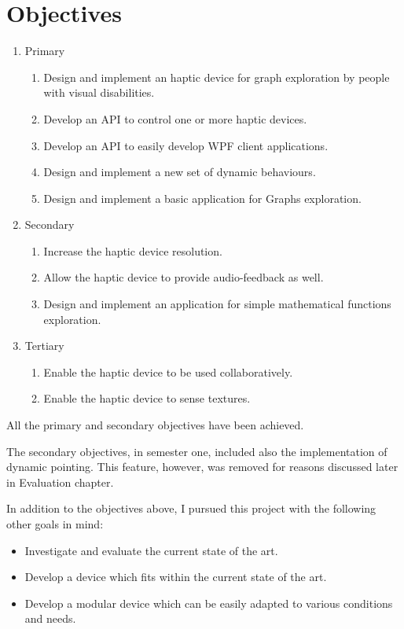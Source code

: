 \chapter{Objectives}


\begin{enumerate}
	\item Primary
    \begin{enumerate}
    	\item Design and implement an haptic device for graph exploration by people with visual disabilities.
        \item Develop an API to control one or more haptic devices.
        \item Develop an API to easily develop WPF client applications.
        \item Design and implement a new set of dynamic behaviours.
        \item Design and implement a basic application for Graphs exploration.
    \end{enumerate}
    \item Secondary
    \begin{enumerate}
        \item Increase the haptic device resolution.
        \item Allow the haptic device to provide audio-feedback as well.
        \item Design and implement an application for simple mathematical functions exploration.
    \end{enumerate}
    \item Tertiary
    \begin{enumerate}
    	\item Enable the haptic device to be used collaboratively.
        \item Enable the haptic device to sense textures.
    \end{enumerate}
\end{enumerate}

All the primary and secondary objectives have been achieved.\par
The secondary objectives, in semester one, included also the implementation of dynamic pointing. This feature, however, was removed for reasons discussed later in Evaluation chapter.

In addition to the objectives above, I pursued this project with the following other goals in mind:
\begin{itemize}
	\item Investigate and evaluate the current state of the art.
    \item Develop a device which fits within the current state of the art.
    \item Develop a modular device which can be easily adapted to various conditions and needs.
\end{itemize}